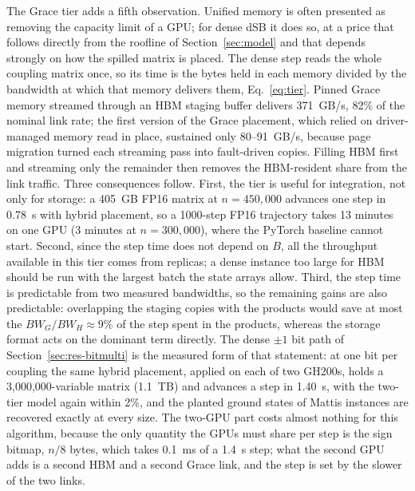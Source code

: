 \documentclass[11pt,a4paper]{article}
\begin{document}
The Grace tier adds a fifth observation. Unified memory is often presented as removing the capacity limit of a GPU; for dense dSB it does so, at a price that follows directly from the roofline of Section~\ref{sec:model} and that depends strongly on how the spilled matrix is placed. The dense step reads the whole coupling matrix once, so its time is the bytes held in each memory divided by the bandwidth at which that memory delivers them, Eq.~\eqref{eq:tier}. Pinned Grace memory streamed through an HBM staging buffer delivers 371~GB/s, 82\% of the nominal link rate; the first version of the Grace placement, which relied on driver-managed memory read in place, sustained only 80--91~GB/s, because page migration turned each streaming pass into fault-driven copies. Filling HBM first and streaming only the remainder then removes the HBM-resident share from the link traffic. Three consequences follow. First, the tier is useful for integration, not only for storage: a 405~GB FP16 matrix at $n=450{,}000$ advances one step in 0.78~s with hybrid placement, so a 1000-step FP16 trajectory takes 13 minutes on one GPU (3 minutes at $n=300{,}000$), where the PyTorch baseline cannot start. Second, since the step time does not depend on $B$, all the throughput available in this tier comes from replicas; a dense instance too large for HBM should be run with the largest batch the state arrays allow. Third, the step time is predictable from two measured bandwidths, so the remaining gains are also predictable: overlapping the staging copies with the products would save at most the $BW_G/BW_H\approx9\%$ of the step spent in the products, whereas the storage format acts on the dominant term directly. The dense $\pm1$ bit path of Section~\ref{sec:res-bitmulti} is the measured form of that statement: at one bit per coupling the same hybrid placement, applied on each of two GH200s, holds a 3,000,000-variable matrix (1.1~TB) and advances a step in 1.40~s, with the two-tier model again within 2\%, and the planted ground states of Mattis instances are recovered exactly at every size. The two-GPU part costs almost nothing for this algorithm, because the only quantity the GPUs must share per step is the sign bitmap, $n/8$ bytes, which takes 0.1~ms of a 1.4~s step; what the second GPU adds is a second HBM and a second Grace link, and the step is set by the slower of the two links.
\end{document}

